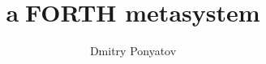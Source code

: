 
\title{{\textcircled{a}}\Huge FORTH metasystem}
\author{Dmitry Ponyatov\\}

\maketitle\clearpage
\secdown\secdown
\tableofcontents\clearpage































